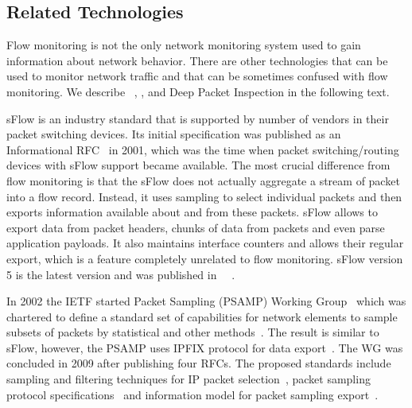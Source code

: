\subsection{Related Technologies}

Flow monitoring is not the only network monitoring system used to gain information about network behavior. There are other technologies that can be used to monitor network traffic and that can be sometimes confused with flow monitoring. We describe ~\cite{Phaal-2004-sFlow}, ,  and Deep Packet Inspection in the following text.

sFlow is an industry standard that is supported by number of vendors in their packet switching devices. Its initial specification was published as an Informational RFC~\cite{rfc3176} in 2001, which was the time when packet switching/routing devices with sFlow support became available. The most crucial difference from flow monitoring is that the sFlow does not actually aggregate a stream of packet into a flow record. Instead, it uses sampling to select individual packets and then exports information available about and from these packets. sFlow allows to export data from packet headers, chunks of data from packets and even parse application payloads. It also maintains interface counters and allows their regular export, which is a feature completely unrelated to flow monitoring. sFlow version 5 is the latest version and was published in ~\citeyear{Phaal-2004-sFlow}~\cite{Phaal-2004-sFlow}.

In 2002 the IETF started Packet Sampling (PSAMP) Working Group~\cite{IETF--Packet} which was chartered to define a standard set of capabilities for network elements to sample subsets of packets by statistical and other methods~\cite{IESG--Packet}. The result is similar to sFlow, however, the PSAMP uses IPFIX protocol for data export~\cite{rfc5477}. The WG was concluded in 2009 after publishing four RFCs. The proposed standards include sampling and filtering techniques for IP packet selection~\cite{rfc5475}, packet sampling protocol specifications~\cite{rfc5476} and information model for packet sampling export~\cite{rfc5477}.

